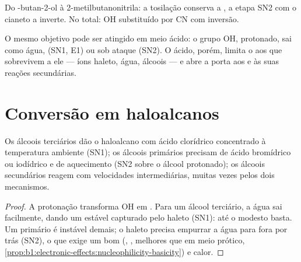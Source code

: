 \begin{omfigure}

{\small Do -butan-2-ol à 2-metilbutanonitrila: a tosilação
conserva a , a etapa SN2 com o cianeto a inverte. No total:
OH substituído por CN com inversão.}
\end{omfigure}

O mesmo objetivo pode ser atingido em meio ácido: o grupo OH, protonado,
sai como água,  (SN1, E1) ou sob ataque (SN2). O
ácido, porém, limita o  aos que sobrevivem a ele --- íons
haleto, água, álcoois --- e abre a porta aos  e às suas
reações secundárias.

\section{Conversão em haloalcanos}

\begin{proposition}\label{prop:b1:alcohol-activation:hx-by-class}
Os álcoois terciários dão o haloalcano com ácido clorídrico concentrado à
temperatura ambiente (SN1); os álcoois primários precisam de ácido
bromídrico ou iodídrico e de aquecimento (SN2 sobre o álcool protonado);
os álcoois secundários reagem com velocidades intermediárias, muitas
vezes pelos dois mecanismos.
\end{proposition}

\begin{proof}
A protonação transforma OH em . Para um álcool terciário, a
água sai facilmente, dando um  estável capturado pelo haleto
(SN1): até o modesto   basta. Um  primário é
instável demais; o haleto precisa empurrar a água para fora por trás
(SN2), o que exige um bom  (, , melhores que
 em meio prótico,
\cref{prop:b1:electronic-effects:nucleophilicity-basicity}) e calor.
\end{proof}

